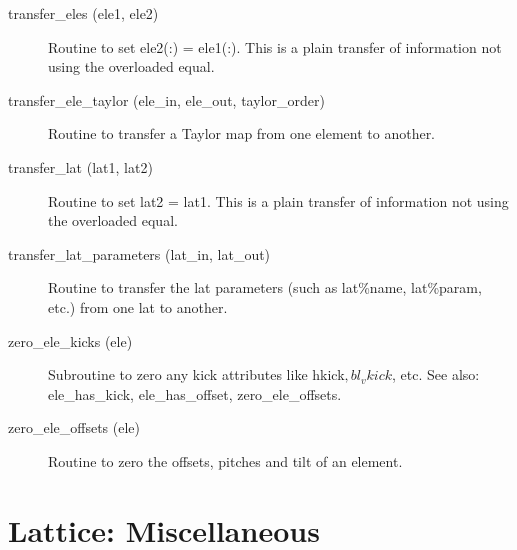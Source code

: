 \begin{description}
\label{r:transfer.eles}
\item[transfer_eles (ele1, ele2)] \Newline 
     Routine to set ele2(:) = ele1(:). 
     This is a plain transfer of information not using the overloaded equal.

\item[transfer_ele_taylor (ele_in, ele_out, taylor_order)] \Newline 
     Routine to transfer a Taylor map from one element to another.

\label{r:transfer.lat}
\item[transfer_lat (lat1, lat2)] \Newline 
     Routine to set lat2 = lat1. 
     This is a plain transfer of information not using the overloaded equal.

\label{r:transfer.lat.parameters}
\item[transfer_lat_parameters (lat_in, lat_out)] \Newline
Routine to transfer the lat parameters (such as lat\%name, 
lat\%param, etc.) from one lat to another. 


\label{r:zero.ele.kicks}
\item[zero_ele_kicks (ele)] \Newline 
Subroutine to zero any kick attributes like hkick$, bl_vkick$, etc.
See also: ele_has_kick, ele_has_offset, zero_ele_offsets.

\label{r:zero.ele.offsets}
\item[zero_ele_offsets (ele)] \Newline 
Routine to zero the offsets, pitches and tilt of an element.

\end{description}

\section{Lattice: Miscellaneous}
\label{r:lat.misc}

